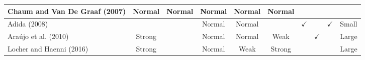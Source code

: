 \documentclass[../access.tex]{subfiles}
\begin{document}
\begin{table}[htbp]
\begin{adjustwidth}{-2cm}{}
\begin{tabular}{m{4.4cm} c c c c c c c c >{\centering\arraybackslash}m{1cm}}
                    \hline
                    \footnotesize{Chaum and Van De Graaf (2007) \cite{Chaum2007}} & {Normal} & {Normal} & {Normal} & {Normal} & {Normal} & {} & {} & {} & \\
                    \hline
                    \footnotesize{Adida (2008) \cite{Adida2008}} & {} & {} & {Normal} & {Normal} & {} & $ \checkmark $ & {} & $ \checkmark $ & \footnotesize{Small} \\
                    \hline
                    \footnotesize{Ara{\' u}jo et al. (2010) \cite{Araujo2010}} & {Strong} & {} & {Normal} & {Normal} & {Weak} & {} & $ \checkmark $ & {} & \footnotesize{Large} \\
                    \hline
                \footnotesize{Locher and Haenni (2016) \cite{Locher2016}} & {Strong} & {} & {Normal} & {Weak} & {Strong} & {} & {} & {} & \footnotesize{Large} \\
                \bottomrule
            \end{tabular}
            \end{adjustwidth}
        \label{tbl:table1}
    \end{table}
    
\end{document}
